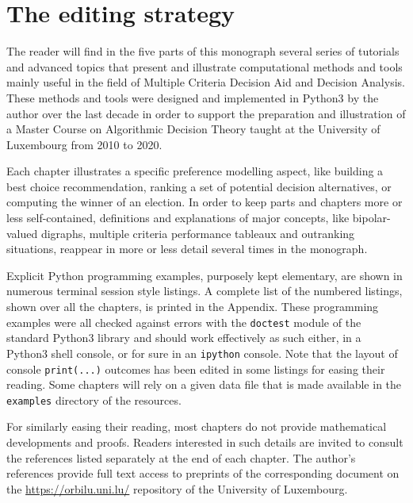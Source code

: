 \label{sec:0}

{}
\section*{The editing strategy}
\label{sec:0.1}

The reader will find in the five parts of this monograph several series of tutorials and advanced topics that present and illustrate computational methods and tools mainly useful in the field of Multiple Criteria Decision Aid and Decision Analysis. These methods and tools were designed and implemented in Python3 by the author over the last decade in order to support the preparation and illustration of a Master Course on Algorithmic Decision Theory taught at the University of Luxembourg from 2010 to 2020.

Each chapter illustrates a specific preference modelling aspect, like building a best choice recommendation, ranking a set of potential decision alternatives, or computing the winner of an election. In order to keep parts and chapters more or less self-contained, definitions and explanations of major concepts, like bipolar-valued digraphs, multiple criteria performance tableaux and outranking situations, reappear in more or less detail several times in the monograph.

Explicit Python programming examples, purposely kept elementary, are shown in numerous terminal session style listings. A complete list of the numbered listings, shown over all the chapters, is printed in the Appendix. These programming examples were all checked against errors with the \texttt{doctest} module of the standard Python3 library and should work effectively as such either, in a Python3 shell console, or for sure in an \texttt{ipython} console. Note that the layout of console \texttt{print(...)} outcomes has been edited in some listings for easing their reading. Some chapters will rely on a given data file that is made available in the \texttt{examples} directory of the \Digraph resources. 

For similarly easing their reading, most chapters do not provide mathematical developments and proofs. Readers interested in such details are invited to consult the references listed separately at the end of each chapter. The author's references provide full text access to preprints of the corresponding document on the \href{https://orbilu.uni.lu/}{https://orbilu.uni.lu/} repository of the University of Luxembourg.

